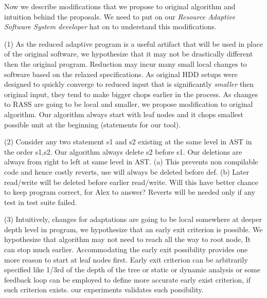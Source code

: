 Now we describe modifications that we propose to original algorithm and intuition behind the proposals. We need to put on our \emph{Resource Adaptive Software System developer} hat on to understand this modifications.

(1) As the reduced adaptive program is a useful artifact that will be used in place of the original software, we hypothesize that it may not be drastically different then the original program. Reduction may incur many small local changes to software based on the relaxed specifications. As original HDD setups were designed to quickly converge to reduced input that is significantly \emph{smaller} then original input, they tend to make bigger chops earlier in the process. As changes to RASS are going to be local and smaller, we propose modification to original algorithm. Our algorithm always start with leaf nodes and it chops smallest possible unit at the beginning (statements for our tool). 

(2) Consider any two statement s1 and s2 existing at the same level in AST in the order s1,s2. Our algorithm always delete s2 before s1. Our deletions are always from right to left at same level in AST. (a) This prevents non compilable code and hence costly reverts, use will always be deleted before def. (b) Later read/write will be deleted before earlier read/write. Will this have better chance to keep program correct, for Alex to answer? Reverts will be needed only if any test in test suite failed.    

(3) Intuitively, changes for adaptations are going to be local somewhere at deeper depth level in program, we hypothesize that an early exit criterion is possible. We hypothesize that algorithm may not need to reach all the way to root node, It can stop much earlier. Accommodating the early exit possibility provides one more reason to start at leaf nodes first. Early exit criterion can be arbitrarily specified like 1/3rd of the depth of the tree or static or dynamic analysis or some feedback loop can be employed to define more accurate early exist criterion, if such criterion exists. our experiments validates such possibility.
